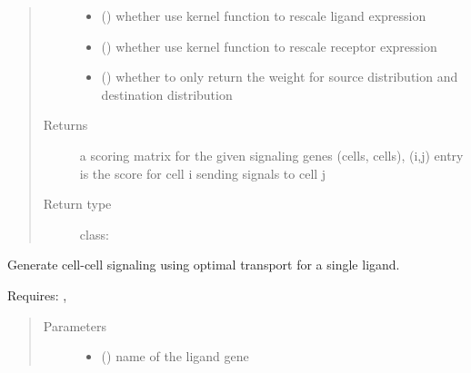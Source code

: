 \documentclass[letterpaper,10pt,english]{sphinxmanual}
\begin{document}
\begin{fulllineitems}
\begin{fulllineitems}
\begin{quote}
\begin{description}
\begin{itemize}
\item {} 
 (\sphinxstyleliteralemphasis{, }) \textendash{} whether use kernel function to rescale ligand expression

\item {} 
 (\sphinxstyleliteralemphasis{, }) \textendash{} whether use kernel function to rescale receptor expression

\item {} 
 (\sphinxstyleliteralemphasis{, }) \textendash{} whether to only return the weight for source distribution and destination distribution

\end{itemize}

\item[{Returns}] \leavevmode
a scoring matrix for the given signaling genes (cells, cells), (i,j) entry is the score for cell i sending signals to cell j

\item[{Return type}] \leavevmode
class:

\end{description}\end{quote}

\end{fulllineitems}


\begin{fulllineitems}
\label{\detokenize{api:spaotsc.SpaOTsc.spatial_sc.spatial_signaling_ot_singleligand}}
Generate cell-cell signaling using optimal transport for a single ligand.

Requires: , 
\begin{quote}\begin{description}
\item[{Parameters}] \leavevmode\begin{itemize}
\item {} 
 () \textendash{} name of the ligand gene


\end{itemize}
\end{description}
\end{quote}
\end{fulllineitems}
\end{fulllineitems}
\end{document}
